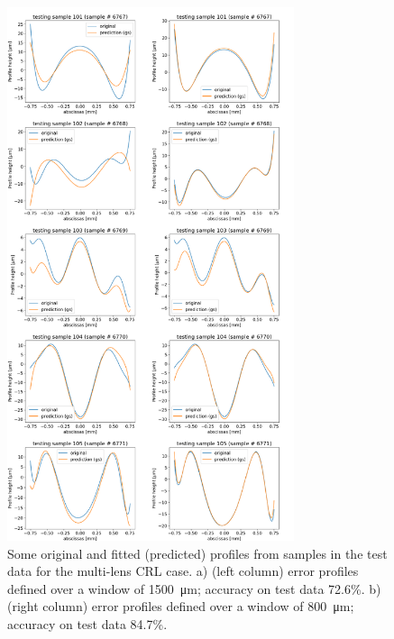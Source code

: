 \documentclass[preprint]{iucr}
\begin{document}
\begin{figure}\label{fig:v26profiles}
\includegraphics[width=0.75\textwidth]{figures/figure7.pdf}




\caption{
Some original and fitted (predicted) profiles from samples in the test data for the multi-lens CRL case. a) (left column) error profiles defined over a window of \SI{1500}{\micro\meter};
accuracy on test data 72.6\%. 
b) (right column) error profiles defined over a window of \SI{800}{\micro\meter};
accuracy on test data 84.7\%.
    }
\end{figure}
\end{document}
